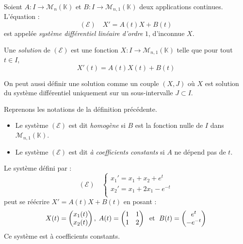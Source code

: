 \documentclass[a4paper,10pt]{report}
\begin{document}
\begin{defin} Soient $A : I \rightarrow \mathcal{M}_n(\mathbb{K})$ et $B : I \rightarrow \mathcal{M}_{n,1}(\mathbb{K})$ deux applications continues. L'équation :
$$ (\mathcal{E}) \quad X'=A(t)X+B(t)$$
est appelée \textit{système différentiel linéaire d'ordre} $1$, d'inconnue $X$.

\noindent Une \textit{solution} de $(\mathcal{E})$ est une fonction $X : I \rightarrow \mathcal{M}_{n,1}(\mathbb{K})$ telle que pour tout $t \in I$,
$$ X'(t) = A(t) X(t) + B(t)$$
\end{defin}

\begin{rem}
On peut aussi définir une solution comme un couple $(X,J)$ où $X$ est solution du système différentiel uniquement sur un sous-intervalle $J \subset I$.
\end{rem}

\begin{defin} Reprenons les notations de la définition précédente.

\begin{itemize}
\item Le système $(\mathcal{E})$ est dit \textit{homogène} si $B$ est la fonction nulle de $I$ dans $\mathcal{M}_{n,1}(\mathbb{K})$.
\item Le système $(\mathcal{E})$ est dit \textit{à coefficients constants} si $A$ ne dépend pas de $t$.
\end{itemize}
\end{defin}

\begin{ex} Le système défini par :
$$ (\mathcal{E}) \quad \left\lbrace \begin{array}{lcl}
x_1'=x_1+x_2 + e^t \\
x_2'=x_1+2x_1 - e^{-t} \\
\end{array}\right.$$
peut se réécrire $X'=A(t)X+B(t)$ en posant :
$$ X(t) = \begin{pmatrix}
x_1(t) \\
x_2(t) \\
\end{pmatrix}, \; A(t) = \begin{pmatrix}
1 & 1 \\
1 & 2 \\
\end{pmatrix} \; \hbox{ et } \; B(t) = \begin{pmatrix}
e^t \\
-e^{-t} \\
\end{pmatrix}$$
Ce système est à coefficients constants.
\end{ex}
\end{document}

